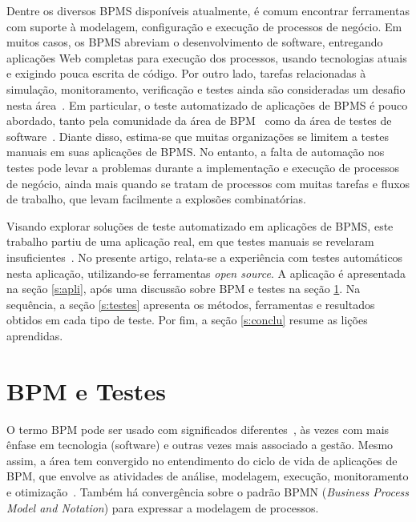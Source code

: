 \documentclass[12pt]{article}
\begin{document}
Dentre os diversos BPMS disponíveis atualmente, é comum encontrar ferramentas com suporte à modelagem, configuração e execução de processos de negócio. Em muitos casos, os BPMS abreviam o desenvolvimento de software, entregando aplicações Web completas para execução dos processos, usando tecnologias atuais e exigindo pouca escrita de código. Por outro lado, tarefas relacionadas à simulação, monitoramento, verificação e testes ainda são consideradas um desafio nesta área~\cite{aalst2013survey}. Em particular, o teste automatizado de aplicações de BPMS é pouco abordado, tanto pela comunidade da área de BPM~\cite{aalst2013survey} como da área de testes de software~\cite{graham2012experiences}. Diante disso, estima-se que muitas organizações se limitem a testes manuais em suas aplicações de BPMS. No entanto, a falta de automação nos testes pode levar a problemas durante a implementação e execução de processos de negócio, ainda mais quando se tratam de processos com muitas tarefas e fluxos de trabalho, que levam facilmente a explosões combinatórias.

Visando explorar soluções de teste automatizado em aplicações de BPMS, este trabalho partiu de uma aplicação real, em que testes manuais se revelaram insuficientes~\cite{sbsi2013}. No presente artigo, relata-se a experiência com testes automáticos nesta aplicação, utilizando-se ferramentas \emph{open source}. A aplicação é apresentada na seção \ref{s:apli}, após uma discussão sobre BPM e testes na seção \ref{s:bpmtest}. Na sequência, a seção \ref{s:testes} apresenta os métodos, ferramentas e resultados obtidos em cada tipo de teste. Por fim, a seção \ref{s:conclu} resume as lições aprendidas.



\section{BPM e Testes}\label{s:bpmtest}

O termo BPM pode ser usado com significados diferentes~\cite{acmxrds2009}, às vezes com mais ênfase em tecnologia (software) e outras vezes mais associado a gestão. Mesmo assim, a área tem convergido no entendimento do ciclo de vida de aplicações de BPM, que envolve as atividades de análise, modelagem, execução, monitoramento e otimização~\cite{ABPMP}. Também há convergência sobre o padrão BPMN (\emph{Business Process Model and Notation}) para expressar a modelagem de processos.
\end{document}
